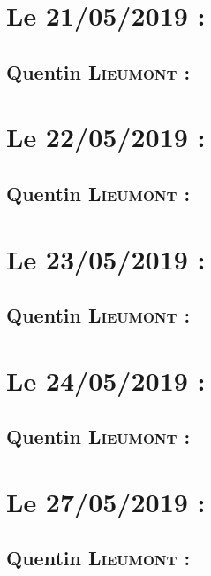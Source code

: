 \section{Le 21/05/2019 :}
    \subsection{Quentin \textsc{Lieumont} :}
        
\newpage
\section{Le 22/05/2019 :}
    \subsection{Quentin \textsc{Lieumont} :}
        
\newpage
\section{Le 23/05/2019 :}
    \subsection{Quentin \textsc{Lieumont} :}
        
\newpage
\section{Le 24/05/2019 :}
    \subsection{Quentin \textsc{Lieumont} :}
        
\newpage
\section{Le 27/05/2019 :}
    \subsection{Quentin \textsc{Lieumont} :}
        
